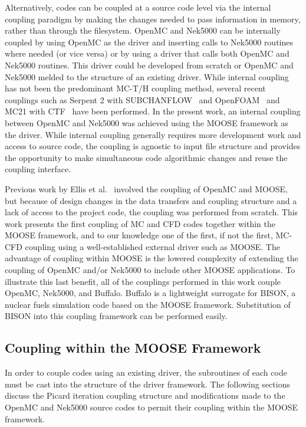 \documentclass[letterpaper]{physor2018}
\begin{document}
Alternatively, codes can be coupled at a source code level via the internal
coupling paradigm by making the changes needed to pass information in memory,
rather than through the filesystem.  OpenMC and Nek5000 can be internally
coupled by using OpenMC as the driver and inserting calls to Nek5000 routines
where needed (or vice versa) or by using a driver that calls both OpenMC and
Nek5000 routines. This driver could be developed from scratch or OpenMC and
Nek5000 melded to the structure of an existing driver.  While internal coupling
has not been the predominant MC-T/H coupling method, several recent couplings
such as Serpent 2 with SUBCHANFLOW~\cite{Daeubler} and OpenFOAM~\cite{Aufiero}
and MC21 with CTF~\cite{Gill} have been performed.  In the present work, an internal
coupling between OpenMC and Nek5000 was achieved using the MOOSE framework as
the driver.  While internal coupling generally requires more development work
and access to source code, the coupling is agnostic to input file structure and
provides the opportunity to make simultaneous code algorithmic changes and reuse
the coupling interface.

Previous work by Ellis et al.~\cite{Ellis} involved the coupling of OpenMC and MOOSE, but because of
design changes in the data transfers and coupling structure and a lack of access to the project code,
the coupling was performed from scratch.
This work presents the first coupling of MC and CFD codes together within
the MOOSE framework, and to our knowledge one of the first, if not the first,
MC-CFD coupling using a well-established external driver such as MOOSE.
The advantage of coupling within MOOSE is the lowered complexity
of extending the coupling of
OpenMC and/or Nek5000 to include other MOOSE applications.
To illustrate this last benefit, all of the couplings performed in this work couple OpenMC,
Nek5000, and Buffalo. Buffalo is a lightweight surrogate for BISON, a
nuclear fuels simulation code based on the MOOSE framework.
Substitution of BISON into
this coupling framework can be performed easily.

\subsection{Coupling within the MOOSE Framework}
\label{sec:MOOSECoupling}
In order to couple codes using an existing driver, the subroutines of each code must be
cast into the structure of the driver framework. The following sections discuss the
Picard iteration coupling structure and
modifications made to the OpenMC and Nek5000 source
codes to permit their coupling within the MOOSE framework.
\end{document}
